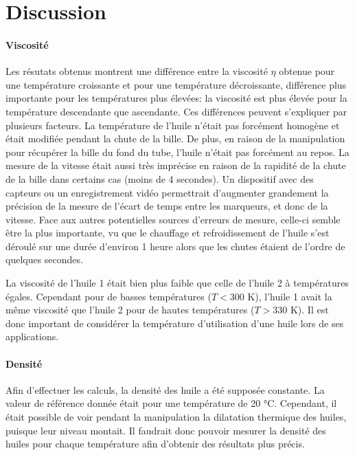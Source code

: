 \section{Discussion}

\paragraph{Viscosité} Les résutats obtenus montrent une différence entre la viscosité \(\eta\) obtenue pour une température croissante et pour une température décroissante, différence plus importante pour les températures plus élevées: la viscosité est plus élevée pour la température descendante que ascendante. Ces différences peuvent s'expliquer par plusieurs facteurs. La température de l'huile n'était pas forcément homogène et était modifiée pendant la chute de la bille. De plus, en raison de la manipulation pour récupérer la bille du fond du tube, l'huile n'était pas forcément au repos. La mesure de la vitesse était aussi très imprécise en raison de la rapidité de la chute de la bille dans certains cas (moins de 4 secondes). Un dispositif avec des capteurs ou un enregistrement vidéo permettrait d'augmenter grandement la précision de la mesure de l'écart de temps entre les marqueurs, et donc de la vitesse. Face aux autres potentielles sources d'erreurs de mesure, celle-ci semble être la plus importante, vu que le chauffage et refroidissement de l'huile s'est déroulé sur une durée d'environ 1 heure alors que les chutes étaient de l'ordre de quelques secondes.

La viscosité de l'huile 1 était bien plus faible que celle de l'huile 2 à températures égales. Cependant pour de basses températures (\(T < 300\) \si{\kelvin}), l'huile 1 avait la même viscosité que l'huile 2 pour de hautes températures (\(T > 330\) \si{\kelvin}). Il est donc important de considérer la température d'utilisation d'une huile lors de ses applications.

\paragraph{Densité} Afin d'effectuer les calculs, la densité des huile a été supposée constante. La valeur de référence donnée était pour une température de 20 \si{\celsius}. Cependant, il était possible de voir pendant la manipulation la dilatation thermique des huiles, puisque leur niveau montait. Il faudrait donc pouvoir mesurer la densité des huiles pour chaque température afin d'obtenir des résultats plus précis.



